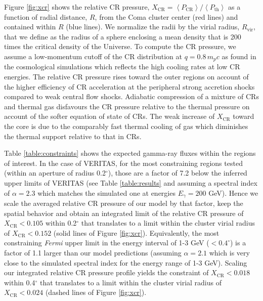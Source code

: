 \documentclass[12pt,manuscript]{aastex}
\newcommand{\expval}[1]{\left\langle #1 \right\rangle}
\newcommand{\rmn}{\mathrm}
\newcommand{\CR}{\mathrm{CR}}
\begin{document}
Figure \ref{fig:xcr} shows the relative CR pressure,
$X_{\CR} = \expval{P_{\CR}}/\expval{P_\rmn{th}}$ as a function of radial distance, $R$, from the
Coma cluster center (red lines) and contained within $R$ (blue lines).  We normalize the radii by
the virial radius, $R_\rmn{vir}$, that we define as the radius of a sphere enclosing a mean density
that is 200 times the critical density of the Universe.  To compute the CR pressure, we assume a
low-momentum cutoff of the CR distribution at $q = 0.8\,m_p c$ as found in the cosmological
simulations which reflects the high cooling rates at low CR energies. The relative CR pressure
rises toward the outer regions on account of the higher efficiency of CR acceleration at the
peripheral strong accretion shocks compared to weak central flow shocks. Adiabatic compression of a
mixture of CRs and thermal gas disfavours the CR pressure relative to the thermal pressure on
account of the softer equation of state of CRs. The weak increase of $X_{\CR}$ toward the core is
due to the comparably fast thermal cooling of gas which diminishes the thermal support relative to
that in CRs.

Table \ref{table:constraints} shows the expected gamma-ray fluxes within the regions of interest.
In the case of VERITAS, for the most constraining regions tested (within an aperture of radius
0.2$^{\circ}$), those are a factor of 7.2 below the inferred upper limits of VERITAS (see Table
\ref{table:results} and assuming a spectral index of $\alpha=2.3$ which matches the simulated one
at energies $E_\gamma=200$ GeV). Hence we scale the averaged relative CR pressure of our model by
that factor, keep the spatial behavior and obtain an integrated limit of the relative CR pressure
of $X_{\CR}<0.105$ within 0.2$^{\circ}$ that translates to a limit within the cluster virial radius
of $X_\CR<0.152$ (solid lines of Figure \ref{fig:xcr}). Equivalently, the most constraining
{\em Fermi} upper limit in the energy interval of 1-3 GeV ($<0.4^\circ$) is a factor of 1.1 larger
than our model predictions (assuming $\alpha=2.1$ which is very close to the simulated spectral
index for the energy range of 1-3 GeV). Scaling our integrated relative CR pressure profile yields
the constraint of $X_{\CR}<0.018$ within 0.4$^{\circ}$ that translates to a limit within the
cluster virial radius of $X_\CR<0.024$ (dashed lines of Figure \ref{fig:xcr}).

%
%
\end{document}
